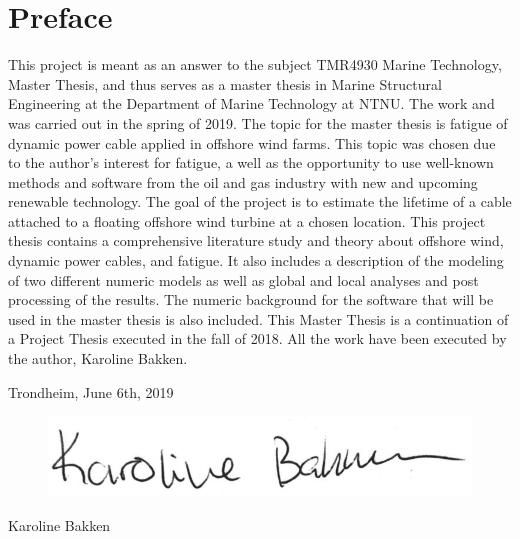 \hypersetup{pageanchor=true}
%
\chapter*{Preface}
This project is meant as an answer to the subject TMR4930 Marine Technology, Master Thesis, and thus serves as a master thesis in Marine Structural Engineering at the Department of Marine Technology at NTNU. The work and was carried out in the spring of 2019. \newline
\newline
The topic for the master thesis is fatigue of dynamic power cable applied in offshore wind farms. This topic was chosen due to the author's interest for fatigue, a well as the opportunity to use well-known methods and software from the oil and gas industry with new and upcoming renewable technology. The goal of the project is to estimate the lifetime of a cable attached to a floating offshore wind turbine at a chosen location.  This project thesis contains a comprehensive literature study and theory about offshore wind, dynamic power cables, and fatigue. It also includes a description of the modeling of two different numeric models as well as global and local analyses and post processing of the results. The numeric background for the software that will be used in the master thesis is also included. \newline
\newline
This Master Thesis is a continuation of a Project Thesis executed in the fall of 2018. All the work have been executed by the author, Karoline Bakken. 
\newline
\newline
\newline
\newline
\newline
\newline
\begin{center}
    Trondheim, June 6th, 2019
    \end{center}
\begin{figure}[H]
\centering
\includegraphics[scale=0.5]{figures/sign}
\end{figure}
\begin{center}
Karoline Bakken
\end{center}
